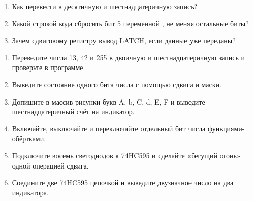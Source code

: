 \begin{selfcheck}
\begin{enumerate}
  \item Как перевести  в десятичную и шестнадцатеричную запись?
  \item Какой строкой кода сбросить бит 5 переменной , не меняя остальные биты?
  \item Зачем сдвиговому регистру вывод LATCH, если данные уже переданы?
\end{enumerate}
\end{selfcheck}

\begin{tasks}
\begin{enumerate}
\item {} Переведите числа 13, 42 и 255 в двоичную и шестнадцатеричную запись и проверьте в программе.
\item {} Выведите состояние одного бита числа с помощью сдвига и маски.
\item {} Допишите в массив рисунки букв A, b, C, d, E, F и выведите шестнадцатеричный счёт на индикатор.
\item {} Включайте, выключайте и переключайте отдельный бит числа функциями-обёртками.
\item {} Подключите восемь светодиодов к 74HC595 и сделайте «бегущий огонь» одной операцией сдвига.
\item {} Соедините две 74HC595 цепочкой и выведите двузначное число на два индикатора.
\end{enumerate}
\end{tasks}
